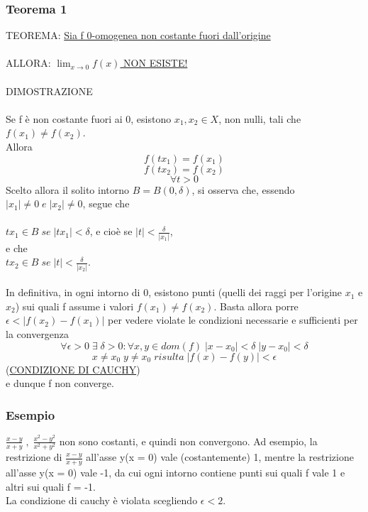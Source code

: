\documentclass[fontsize = 20px, paper = a4]{article}
\begin{document}
\subsubsection{Teorema 1}
TEOREMA: \underline{Sia f 0-omogenea non costante fuori dall'origine }\\ \\
ALLORA: \underline{$\lim_{x \to 0}f(x)$ NON ESISTE!}\\ \\
DIMOSTRAZIONE\\ \\
Se f è non costante fuori ai 0, esistono $x_1 , x_2 \in X$, non nulli,  tali che $f(x_1) \neq f(x_2)$. \\
Allora
$$f(tx_1) = f(x_1)$$
$$f(tx_2) = f(x_2)$$
$$\forall t > 0$$
Scelto allora il solito intorno $B = B(0,\delta)$, si osserva che, essendo $|x_1| \neq 0 \; e \; |x_2| \neq 0$, segue che
 \\ \\
 \hspace*{3cm }$tx_1 \in B \; se \; |tx_1| < \delta $, e cioè se $|t| < \frac{\delta}{|x_1|}$, 
\\ 
 e che 
\\ 
\hspace*{3cm} $tx_2 \in B \; se \;|t| < \frac{\delta}{|x_2|} $. \\ \\
In definitiva, in ogni intorno di 0, esistono punti (quelli dei raggi per l'origine $x_1$ e $x_2$) sui quali f assume i valori $f(x_1) \neq f(x_2)$. Basta allora porre $\epsilon < |f(x_2) - f(x_1)| $ per vedere violate le condizioni necessarie e sufficienti per la convergenza
$$\forall \epsilon > 0 \; \exists \; \delta > 0 : \forall x,y \in dom(f) \; |x - x_0| < \delta \; |y - x_0| < \delta$$
$$x \neq x_0 \; y \neq  x_0 \; risulta \; |f(x) - f(y)| < \epsilon$$
\hspace{3.7cm}(\underline{CONDIZIONE DI CAUCHY})\\
e dunque f non converge.
\subsubsection{Esempio}
$\frac{x-y}{x + y} \; , \; \frac{x^2 - y^2}{x^2 + y^2}$ non sono costanti, e quindi non convergono. Ad esempio, la restrizione di $\frac{x - y}{x + y}$ all'asse y(x = 0) vale (costantemente) 1, mentre la restrizione all'asse y(x = 0) vale -1, da cui ogni intorno contiene punti sui quali f vale 1 e altri sui quali f = -1. \\
La condizione di cauchy è violata scegliendo $\epsilon < 2$.
\end{document}

